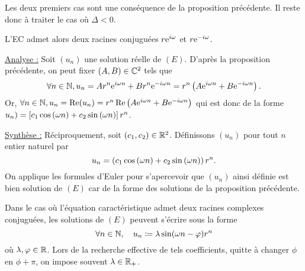 \documentclass{magnolia}
\begin{document}
\begin{preuve}
Les deux premiers cas sont une conséquence de la proposition précédente. Il reste donc à traiter le cas où $\Delta<0$.

L'EC admet alors deux racines conjuguées $r{\rm e}^{i\omega}$ et $r{\rm e}^{-i\omega}$. 

\underline{Analyse :} Soit $(u_n)$ une solution réelle de $(E)$. D'après la proposition précédente, on peut fixer $(A,B)\in \mathbb{C}^2$ tels que \[\forall n\in\mathbb{N}, u_n=Ar^n{\rm e}^{i\omega n}+Br^n{\rm e}^{-i\omega n}=r^n\left(A{\rm e}^{i\omega n}+B{\rm e}^{-i\omega n}\right).\]
Or, $\forall n\in\mathbb{N}, u_n=\mathop{\rm Re}(u_n)=r^n\mathop{\rm Re}\left(A{\rm e}^{i\omega n}+B{\rm e}^{-i\omega n}\right)$ qui est donc de la forme $u_n)=\left[c_1\cos\left(\omega n\right)+c_2\sin\left(\omega n\right)\right]r^n$.

\underline{Synthèse :} Réciproquement, soit $(c_1,c_2)\in\mathbb{R}^2$. Définissons $(u_n)$ pour tout $n$ entier naturel par $$u_n=\left(c_1\cos\left(\omega n\right)+c_2\sin\left(\omega n\right)\right)r^n.$$
On applique les formules d'Euler pour s'apercevoir que $(u_n)$ ainsi définie est bien solution de $(E)$ car de la forme des solutions de la proposition précédente.

\end{preuve}

\begin{remarqueUnique}
\remarque Dans le cas où l'équation caractéristique admet deux racines
  complexes conjuguées, les solutions de $(E)$ peuvent s'écrire sous la forme
  \[\forall n\in\mathbb{N} ,\quad u_n\coloneqq\lambda\sin(\omega n-\varphi) r^n\]
  où $\lambda,\varphi\in\mathbb{R}$.
  Lors de la recherche effective de tels coefficients, 
  quitte à changer $\phi$ en $\phi+\pi$, on impose souvent $\lambda\in\mathbb{R}_+$.
\end{remarqueUnique}
\end{document}
